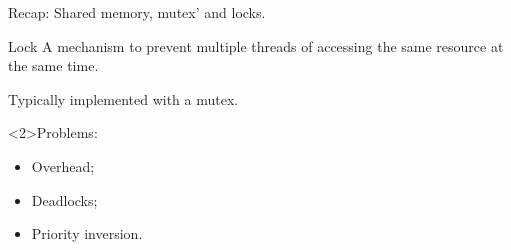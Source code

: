 \begin{frame}{Recap: Shared memory, mutex' and locks.}
	\begin{block}{Lock}
		A mechanism to prevent multiple threads of accessing the same resource at the same time. 
	\end{block}
	Typically implemented with a mutex. 

	\begin{exampleblock}{Problems:}
		\begin{itemize}
			\item Overhead;
			\item Deadlocks;
			\item Priority inversion.
		\end{itemize}
	\end{exampleblock}

\end{frame}
